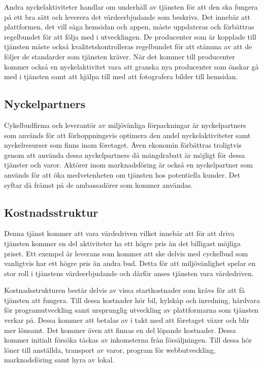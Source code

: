 \documentclass[10pt,a4paper,oneside]{article}
\begin{document}
Andra nyckelaktiviteter handlar om underhåll av tjänsten för att den ska fungera på ett bra sätt och leverera det värdeerbjudande som beskrivs. Det innebär att plattformen, det vill säga hemsidan och appen, måste uppdateras och förbättras regelbundet för att följa med i utvecklingen. De producenter som är kopplade till tjänsten måste också kvalitetskontrolleras regelbundet för att stämma av att de följer de standarder som tjänsten kräver. När det kommer till producenter kommer också en nyckelaktivitet vara att granska nya producenter som önskar gå med i tjänsten samt att hjälpa till med att fotografera bilder till hemsidan. 

\subsection{Nyckelpartners}
Cykelbudfirma och leverantör av miljövänliga förpackningar är nyckelpartners som används för att förhoppningsvis optimera den andel nyckelaktiviteter samt nyckelresurser som finns inom företaget. Även ekonomin förbättras troligtvis genom att använda dessa nyckelpartners då mängdrabatt är möjligt för dessa tjänster och varor. Aktörer inom marknadsföring är också en nyckelpartner som används för att öka medvetenheten om tjänsten hos potentiella kunder. Det syftar då främst på de ambassadörer som kommer användas. 

\subsection{Kostnadsstruktur}
Denna tjänst kommer att vara värdedriven vilket innebär att för att driva tjänsten kommer en del aktiviteter ha ett högre pris än det billigast möjliga priset. Ett exempel är leverans som kommer att ske delvis med cyckelbud som vanligtvis har ett högre pris än andra bud. Detta för att miljövänlighet spelar en stor roll i tjänstens värdeerbjudande och därför anses tjänsten vara värdedriven. 

Kostnadsstrukturen består delvis av vissa startkostnader som krävs för att få tjänsten att fungera. Till dessa kostnader hör bil, kylskåp och inredning, hårdvara för programutveckling samt ursprunglig utveckling av plattformarna som tjänsten verkar på. Dessa kommer att betalas av i takt med att företaget växer och blir mer lönsamt. Det kommer även att finnas en del löpande kostnader. Dessa kommer initialt försöka täckas av inkomsterna från försäljningen. Till dessa hör löner till anställda, transport av varor, program för webbutveckling, marknadsföring samt hyra av lokal.  
\end{document}
